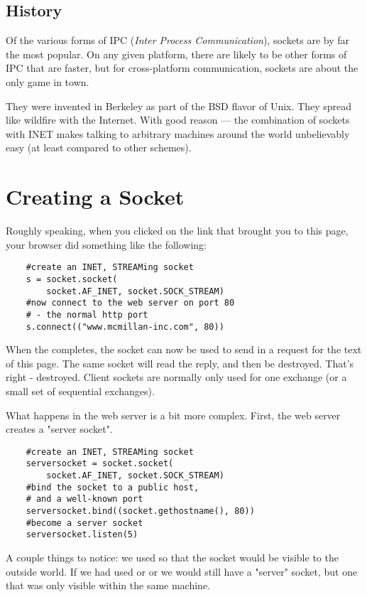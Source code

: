 \documentclass{howto}
\begin{document}
\subsection{History}

Of the various forms of IPC (\emph{Inter Process Communication}),
sockets are by far the most popular.  On any given platform, there are
likely to be other forms of IPC that are faster, but for
cross-platform communication, sockets are about the only game in town.

They were invented in Berkeley as part of the BSD flavor of Unix. They
spread like wildfire with the Internet. With good reason --- the
combination of sockets with INET makes talking to arbitrary machines
around the world unbelievably easy (at least compared to other
schemes).  

\section{Creating a Socket}

Roughly speaking, when you clicked on the link that brought you to
this page, your browser did something like the following:

\begin{verbatim}
    #create an INET, STREAMing socket
    s = socket.socket(
        socket.AF_INET, socket.SOCK_STREAM)
    #now connect to the web server on port 80 
    # - the normal http port
    s.connect(("www.mcmillan-inc.com", 80))
\end{verbatim}

When the  completes, the socket  can
now be used to send in a request for the text of this page. The same
socket will read the reply, and then be destroyed. That's right -
destroyed. Client sockets are normally only used for one exchange (or
a small set of sequential exchanges).

What happens in the web server is a bit more complex. First, the web
server creates a "server socket".

\begin{verbatim}
    #create an INET, STREAMing socket
    serversocket = socket.socket(
        socket.AF_INET, socket.SOCK_STREAM)
    #bind the socket to a public host, 
    # and a well-known port
    serversocket.bind((socket.gethostname(), 80))
    #become a server socket
    serversocket.listen(5)
\end{verbatim}

A couple things to notice: we used 
so that the socket would be visible to the outside world. If we had
used  or  or  we would still
have a "server" socket, but one that was only visible within the same
machine.
\end{document}
